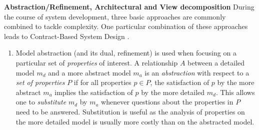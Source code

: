 \noindent
\textbf{Abstraction/Refinement, Architectural and View decomposition} 
During the course of system development, three basic approaches are commonly combined to tackle 
complexity. One particular combination of these approaches leads to Contract-Based System Design  \cite{SystemDesignContracts}.
\begin{enumerate}
    \item Model abstraction (and its dual, refinement) is used when focusing on 
    a particular set of \emph{properties} of interest. A relationship $A$ between a detailed model 
    $m_d$ and a more abstract model $m_a$ is an \emph{abstraction} with respect to a 
    \emph{set of properties} $P$ if for all properties $p \in P$, the satisfaction of $p$ by the more abstract $m_a$ implies the satisfaction of $p$ by the more detailed $m_d$. 
    This allows one to \emph{substitute} $m_d$ by $m_a$ whenever questions about the properties in $P$ need to be answered. Substitution is useful as the analysis of properties on the more detailed model is usually more costly
    than on the abstracted model.

\end{enumerate}
